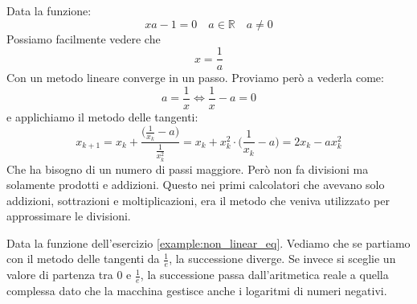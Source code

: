 \begin{example}
	Data la funzione:
	\begin{equation*}
		xa-1=0 \quad a \in \mathbb{R} \quad a \neq 0
	\end{equation*}
	Possiamo facilmente vedere che
	\begin{equation*}
		x=\frac{1}{a}
	\end{equation*}
	Con un metodo lineare converge in un passo. Proviamo però a vederla come:
	\begin{equation*}
		a=\frac{1}{x} \Leftrightarrow \frac{1}{x}-a=0
	\end{equation*}
	e applichiamo il metodo delle tangenti:
	\begin{equation*}
		x_{k+1}=x_k + \frac{\big(\frac{1}{x_k} - a\big)}{\frac{1}{x_k^2}} = x_k + x_k^2 \cdot \bigg(\frac{1}{x_k} - a\bigg) = 2x_k-ax_k^2
	\end{equation*}
	Che ha bisogno di un numero di passi maggiore. Però non fa divisioni ma solamente prodotti e addizioni. Questo nei primi calcolatori che avevano solo addizioni, sottrazioni e moltiplicazioni, era il metodo che veniva utilizzato per approssimare le divisioni.
\end{example}

\begin{example}
	Data la funzione dell'esercizio \ref{example:non_linear_eq}. Vediamo che se partiamo con il metodo delle tangenti da $\frac{1}{e}$, la successione diverge. Se invece si sceglie un valore di partenza tra $0$ e $\frac{1}{e}$, la successione passa dall'aritmetica reale a quella complessa dato che la macchina gestisce anche i logaritmi di numeri negativi.
\end{example}